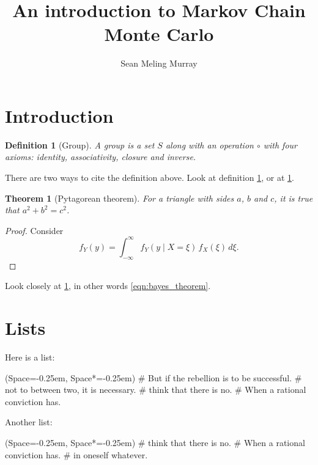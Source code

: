 \documentclass[12pt, a4paper]{article} %
\title{An introduction to Markov Chain Monte Carlo}
\author{Sean Meling Murray}
\theoremstyle{plainspaced}
\newtheorem{theorem}{Theorem}
\newtheorem{definition}{Definition}
\numberwithin{equation}{section}
\newcommand{\listSpace}{-0.25em}
\begin{document}
\maketitle
\pagestyle{fancy}
\begin{abstract}
\blindmathtrue 
\blindtext[1]
\end{abstract}
\tableofcontents


\section{Introduction}
\blindmathtrue 
\blindtext[1]
\begin{definition}[Group]
	\label{def:group}
	A group is a set $S$ along with an operation $\circ$
	with four axioms: identity, associativity, closure and inverse.
\end{definition}
There are two ways to cite the definition above.
Look at definition \ref{def:group}, or at \cref{def:group}.

\begin{theorem}[Pytagorean theorem]
	\label{thm:pyta}
	For a triangle with sides $a$, $b$ and $c$,
	it is true that $a^2 + b^2 = c^2$.
\end{theorem}
\begin{proof}
	Consider
	\begin{equation}
	\label{eqn:bayes_theorem}
		f_Y(y) = \int_{-\infty}^\infty f_Y(y\mid X=\xi )\,f_X(\xi)\,d\xi .
	\end{equation}
\end{proof}
Look closely at \cref{thm:pyta}, in other words 
\cref{eqn:bayes_theorem}.

\blindmathtrue 
\blindtext[1]


\section{Lists}
Here is a list:
\begin{easylist}[itemize]
	\ListProperties(Space=\listSpace, Space*=\listSpace)
	# But if the rebellion is to be successful.
	# not to  between two, it is necessary.
	# think that there is no.
	# When a rational conviction has.
\end{easylist}

Another list:
\begin{easylist}[enumerate]
	\ListProperties(Space=\listSpace, Space*=\listSpace)
	# think that there is no.
	# When a rational conviction has.
	# in oneself whatever.
\end{easylist}
\end{document}
